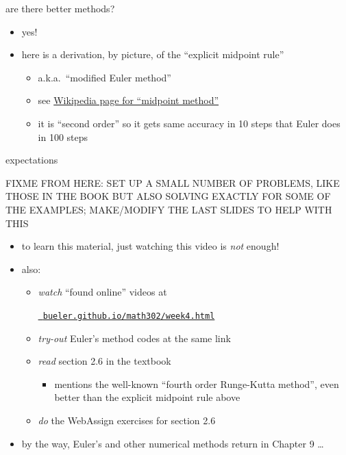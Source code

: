 \documentclass{beamer}
\begin{document}
\begin{frame}{are there better methods?}

\begin{itemize}
\item yes!
\item here is a derivation, by picture, of the ``explicit midpoint rule''
    \begin{itemize}
    \item a.k.a.~``modified Euler method''
    \item see \href{https://en.wikipedia.org/wiki/Midpoint_method}{\color{cyan} Wikipedia page for ``midpoint method''}
    \item it is ``second order'' so it gets same accuracy in 10 steps that Euler does in 100 steps
    \end{itemize}
\end{itemize}

\vspace{50mm}
\end{frame}


\begin{frame}{expectations}

FIXME FROM HERE: SET UP A SMALL NUMBER OF PROBLEMS, LIKE THOSE IN THE BOOK BUT ALSO SOLVING EXACTLY FOR SOME OF THE EXAMPLES; MAKE/MODIFY THE LAST SLIDES TO HELP WITH THIS

\begin{itemize}
\item to learn this material, just watching this video is \emph{not} enough!

\item also:
     \begin{itemize}
     \item \emph{watch} ``found online'' videos at

     \centerline{\href{https://bueler.github.io/math302/week4.html}{\tt \color{cyan} bueler.github.io/math302/week4.html}}
     \item \emph{try-out} Euler's method codes at the same link
     \item \emph{read} section 2.6 in the textbook
         \begin{itemize}
         \item mentions the well-known ``fourth order Runge-Kutta method'', even better than the explicit midpoint rule above
         \end{itemize}
     \item \emph{do} the WebAssign exercises for section 2.6
     \end{itemize}

\bigskip
\item by the way, Euler's and other numerical methods return in Chapter 9 \dots
\end{itemize}
\end{frame}
\end{document}
